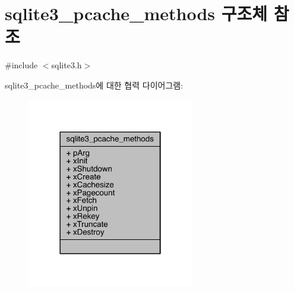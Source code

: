 \hypertarget{structsqlite3__pcache__methods}{}\section{sqlite3\+\_\+pcache\+\_\+methods 구조체 참조}
\label{structsqlite3__pcache__methods}


{\ttfamily \#include $<$sqlite3.\+h$>$}



sqlite3\+\_\+pcache\+\_\+methods에 대한 협력 다이어그램\+:
\nopagebreak
\begin{figure}[H]
\begin{center}
\leavevmode
\includegraphics[width=206pt]{structsqlite3__pcache__methods__coll__graph}
\end{center}
\end{figure}
